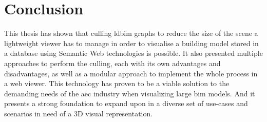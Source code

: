 \section{Conclusion}

This thesis has shown that culling \ac{ldbim} graphs to reduce the size of the scene a lightweight viewer has to manage in order to visualise a building model stored in a database using Semantic Web technologies is possible. It also presented multiple approaches to perform the culling, each with its own advantages and disadvantages, as well as a modular approach to implement the whole process in a web viewer. This technology has proven to be a viable solution to the demanding needs of the \ac{aec} industry when visualizing large \ac{bim} models. And it presents a strong foundation to expand upon in a diverse set of use-cases and scenarios in need of a 3D visual representation.